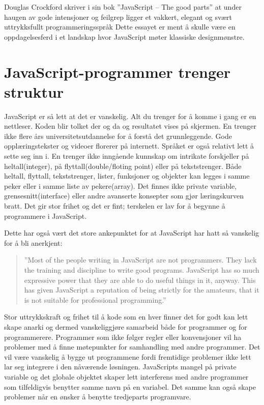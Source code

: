 \documentclass[norsk]{article}
\begin{document}
Douglas Crockford skriver i sin bok ”JavaScript – The good parts” at under haugen av gode intensjoner og feilgrep ligger et vakkert, elegant og svært uttrykksfullt programmeringsspråk \parencite[s. 2]{crockfordGoodparts}Dette essayet er ment å skulle være en oppdagelsesferd i et landskap hvor JavaScript møter klassiske designmønstre. 
\section{JavaScript-programmer trenger struktur}
JavaScript er så lett at det er vanskelig. Alt du trenger for å komme i gang er en nettleser. Koden blir tolket der og da og resultatet vises på skjermen. En trenger ikke flere års universitetsutdannelse for å forstå det grunnleggende. Gode opplæringstekster og videoer florerer på internett. Språket er også relativt lett å sette seg inn i. En trenger ikke inngående kunnskap om intrikate forskjeller på heltall(integer), på flyttall(double/floting point) eller på tekststrenger. Både heltall, flyttall, tekststrenger, lister, funksjoner og objekter kan legges i samme peker eller i samme liste av pekere(array). Det finnes ikke private variable, grensesnitt(interface) eller andre avanserte konsepter som gjør læringskurven bratt. Det gir stor frihet og det er fint; terskelen er lav for å begynne å programmere i JavaScript.

Dette har også vært det store ankepunktet for at JavaScript har hatt så vanskelig for å bli anerkjent: 
\begin{quotation}
”Most of the people writing in JavaScript are not programmers. They lack the training and discipline to write good programs. JavaScript has so much expressive power that they are able to do useful things in it, anyway. This has given JavaScript a reputation of being strictly for the amateurs, that it is not suitable for professional programming.” \parencite{crockfordMisunderstood}
\end{quotation}
Stor uttrykkskraft og frihet til å kode som en hver finner det for godt kan lett skape anarki og dermed vanskeliggjøre samarbeid både for programmer og for programmerere. Programmer som ikke følger regler eller konvensjoner vil ha problemer med å finne møtepunkter for samhandling med andre programmer. Det vil være vanskelig å bygge ut programmene fordi fremtidige problemer ikke lett lar seg integrere i den nåværende løsningen. JavaScripts mangel på private variable og det globale objektet skaper lett interferens med andre programmer som tilfeldigvis benytter samme navn på en variabel. Det samme kan også skape problemer når en ønsker å benytte tredjeparts programvare. 
\end{document}
